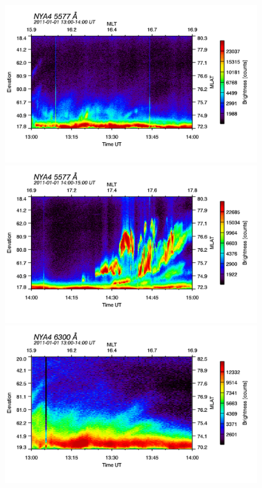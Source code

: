 \begin{figure}
\begin{minipage}{0.24\textwidth}
\includegraphics[width=\textwidth]{Figures/Allsky/5577/nya4_20110101_1300_1400_5577_cal.png}
\end{minipage}
\begin{minipage}{0.24\textwidth}
\includegraphics[width=\textwidth]{Figures/Allsky/5577/nya4_20110101_1400_1500_5577_cal.png}
\end{minipage}
\begin{minipage}{0.24\textwidth}
\includegraphics[width=\textwidth]{Figures/Allsky/6300/nya4_20110101_1300_1400_6300_cal.png}

\end{minipage}
\end{figure}
